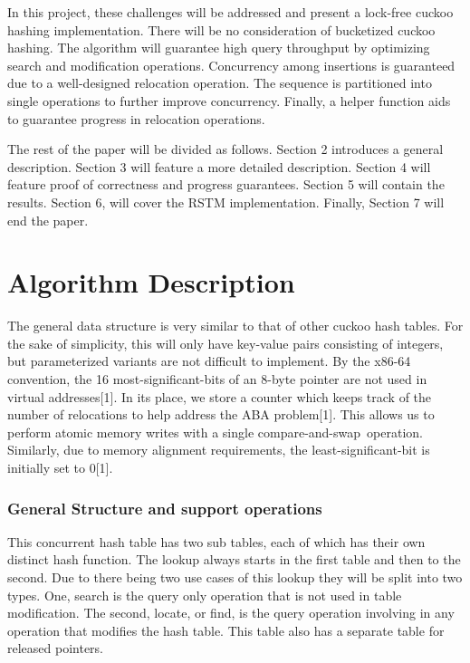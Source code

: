 \documentclass{article}
\begin{document}
In this project, these challenges will be addressed and present a lock-free cuckoo hashing implementation. There will be
no consideration of bucketized cuckoo hashing. The algorithm will guarantee high query throughput by optimizing search
and modification operations. Concurrency among insertions is guaranteed due to a well-designed relocation operation.
The sequence is partitioned into single operations to further improve concurrency. Finally, a helper function aids to
guarantee progress in relocation operations.

The rest of the paper will be divided as follows. Section 2 introduces a general description. Section 3 will feature a
more detailed description. Section 4 will feature proof of correctness and progress guarantees. Section 5 will contain
the results. Section 6, will cover the RSTM implementation. Finally, Section 7 will end the paper.

\section{Algorithm Description}
The general data structure is very similar to that of other cuckoo hash tables. For the sake of simplicity, this will
only have key-value pairs consisting of integers, but parameterized variants are not difficult to implement. By the
x86-64 convention, the 16 most-significant-bits of an 8-byte pointer are not used in virtual addresses[1]. In its
place, we store a counter which keeps track of the number of relocations to help address the ABA problem[1]. This
allows us to perform atomic memory writes with a single compare-and-swap~operation. Similarly, due to memory alignment
requirements, the least-significant-bit is initially set to 0[1].

\subsubsection[General Structure and support operations]{General Structure and support operations}
This concurrent hash table has two sub tables, each of which has their own distinct hash function. The lookup always
starts in the first table and then to the second. Due to there being two use cases of this lookup they will be split
into two types. One, search is the query only operation that is not used in table modification. The second, locate, or
find, is the query operation involving in any operation that modifies the hash table. This table also has a separate
table for released pointers.
\end{document}
